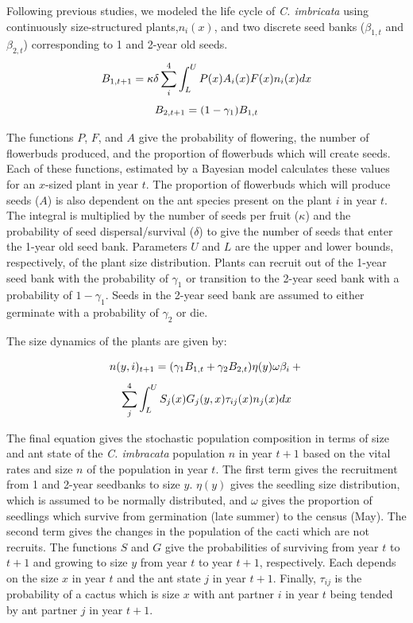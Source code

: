 \documentclass[12pt,a4paper]{article}
\begin{document}
Following previous studies, we modeled the life cycle of \textit{C. imbricata} using continuously size-structured plants,$n_i(x)$, and two discrete seed banks ($\beta_{1,t}$ and $\beta_{2,t}$) corresponding to 1 and 2-year old seeds.
$$
B_{1, t+1} = \kappa \delta \sum_{i}^{4} \int_L^U P(x) A_i(x) F(x)n_i(x) dx \\
$$
$$
B_{2,t+1} =  (1 - \gamma_1)B_{1,t}\\
$$

The functions $P$, $F$, and $A$ give the probability of flowering, the number of flowerbuds produced, and the proportion of flowerbuds which will create seeds. 
Each of these functions, estimated by a Bayesian model calculates these values for an $x$-sized plant in year $t$. 
The proportion of flowerbuds which will produce seeds ($A$) is also dependent on the ant species present on the plant $i$ in year $t$. 
The integral is multiplied by the number of seeds per fruit ($\kappa$) and the probability of seed dispersal/survival ($\delta$) to give the number of seeds that enter the 1-year old seed bank. 
Parameters $U$ and $L$ are the upper and lower bounds, respectively, of the plant size distribution. 
Plants can recruit out of the 1-year seed bank with the probability of $\gamma_1$ or transition to the 2-year seed bank with a probability of $1 - \gamma_1$. 
Seeds in the 2-year seed bank are assumed to either germinate with a probability of $\gamma_2$ or die. 

The size dynamics of the plants are given by:

$$
n(y,i)_{t+1} = (\gamma_1 B_{1,t} + \gamma_2 B_{2,t}) \eta(y) \omega \beta_i  + \\
$$
$$
\sum_{j}^{4} \int_L^U S_j(x) G_j(y,x) \tau_{ij}(x) n_j(x) dx \\
$$

The final equation gives the stochastic population composition in terms of size and ant state of the \textit{C. imbracata} population $n$ in year $t+1$ based on the vital rates and size $n$ of the population in year $t$.
The first term gives the recruitment from 1 and 2-year seedbanks to size $y$.
$\eta(y)$ gives the seedling size distribution, which is assumed to be normally distributed, and $\omega$ gives the proportion of seedlings which survive from germination (late summer) to the census (May). 
The second term gives the changes in the population of the cacti which are not recruits. 
The functions $S$ and $G$ give the probabilities of surviving from year $t$ to $t+1$ and growing to size $y$ from year $t$ to year $t+1$, respectively. 
Each depends on the size $x$ in year $t$ and the ant state $j$ in year $t+1$. 
Finally, $\tau_{ij}$ is the probability of a cactus which is size $x$ with ant partner $i$ in year $t$ being tended by ant partner $j$ in year $t+1$. 
\end{document}

